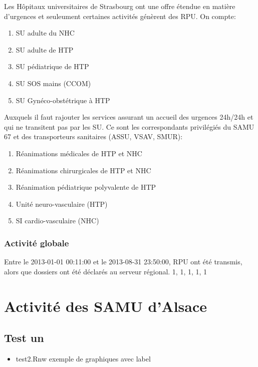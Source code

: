 \documentclass[12pt,english,french,twoside]{report}\usepackage[]{graphicx}\usepackage[]{color}
\begin{document}
Les Hôpitaux universitaires de Strasbourg ont une offre étendue en matière d'urgences et seuleument certaines activités génèrent des RPU.
On compte:
\begin{enumerate}
  \item SU adulte du NHC
  \item SU adulte de HTP
  \item SU pédiatrique de HTP
  \item SU SOS mains (CCOM)
  \item SU Gynéco-obstétrique à HTP
\end{enumerate}
Auxquels il faut rajouter les services assurant un accueil des urgences 24h/24h et qui ne transitent pas par les SU. Ce sont les correspondants privilégiés du SAMU 67 et des transporteurs sanitaires (ASSU, VSAV, SMUR):
\begin{enumerate}
  \item Réanimations médicales de HTP et NHC
  \item Réanimations chirurgicales de HTP et NHC
  \item Réanimation pédiatrique polyvalente de HTP
  \item Unité neuro-vasculaire (HTP)
  \item SI cardio-vasculaire (NHC)
\end{enumerate}

\section{Activité globale}




Entre le 2013-01-01 00:11:00 et le 2013-08-31 23:50:00,  RPU ont été transmis, alors que  dossiers ont été déclarés au serveur régional. 
1, 1, 1, 1, 1



\part{Activité des SAMU d'Alsace}

\chapter{Test un}

\begin{itemize}
  \item test2.Rnw exemple de graphiques avec label
\end{itemize}
\end{document}
